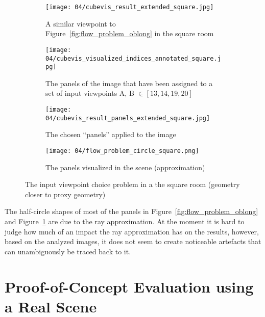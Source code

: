 \begin{figure}
\centering
    \hfill
    \begin{subfigure}[c]{0.45\textwidth}
            \centering
            \texttt{[image: 04/cubevis\_result\_extended\_square.jpg]}
            \caption{A similar viewpoint to Figure~\ref{fig:flow_problem_oblong} in the square room}
    \end{subfigure}
    \hfill
    \begin{subfigure}[c]{0.45\textwidth}
            \centering
            \texttt{[image: 04/cubevis\_visualized\_indices\_annotated\_square.jpg]}
            \caption{The panels of the image that have been assigned to a set of input viewpoints A, B $\in [13, 14, 19, 20]$}
    \end{subfigure}
    \hfill

    \hfill
    \begin{subfigure}[c]{0.45\textwidth}
            \centering
            \texttt{[image: 04/cubevis\_result\_panels\_extended\_square.jpg]}
            \caption{The chosen ``panels'' applied to the image}
    \end{subfigure}
    \hfill
    \begin{subfigure}[c]{0.45\textwidth}
            \centering
            \texttt{[image: 04/flow\_problem\_circle\_square.png]}
            \caption{The panels visualized in the scene (approximation)}
    \end{subfigure}
    \hfill
  \caption{The input viewpoint choice problem in a the square room (geometry closer to proxy geometry)} \label{fig:flow_problem_square}
\end{figure}

The half-circle shapes of most of the panels in Figure~\ref{fig:flow_problem_oblong} and Figure~\ref{fig:flow_problem_square} are due to the ray approximation. At the moment it is hard to judge how much of an impact the ray approximation has on the results, however, based on the analyzed images, it does not seem to create noticeable artefacts that can unambiguously be traced back to it.




















\section{Proof-of-Concept Evaluation using a Real Scene} \label{sec:pof_eval}

